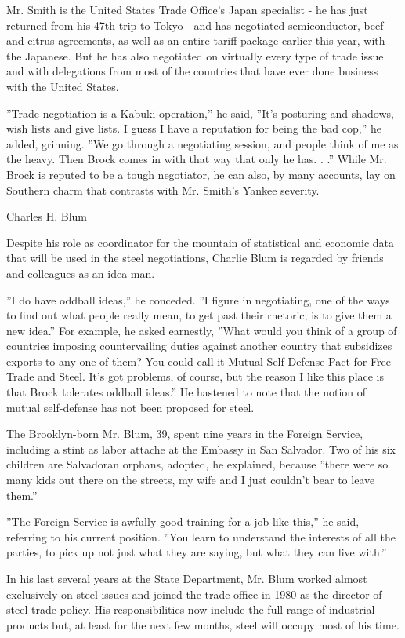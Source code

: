 Mr. Smith is the United States Trade Office's Japan specialist - he has
just returned from his 47th trip to Tokyo - and has negotiated
semiconductor, beef and citrus agreements, as well as an entire tariff
package earlier this year, with the Japanese. But he has also negotiated
on virtually every type of trade issue and with delegations from most of
the countries that have ever done business with the United States.

''Trade negotiation is a Kabuki operation,'' he said, ''It's posturing
and shadows, wish lists and give lists. I guess I have a reputation for
being the bad cop,'' he added, grinning. ''We go through a negotiating
session, and people think of me as the heavy. Then Brock comes in with
that way that only he has. . .'' While Mr. Brock is reputed to be a
tough negotiator, he can also, by many accounts, lay on Southern charm
that contrasts with Mr. Smith's Yankee severity.

Charles H. Blum

Despite his role as coordinator for the mountain of statistical and
economic data that will be used in the steel negotiations, Charlie Blum
is regarded by friends and colleagues as an idea man.

''I do have oddball ideas,'' he conceded. ''I figure in negotiating, one
of the ways to find out what people really mean, to get past their
rhetoric, is to give them a new idea.'' For example, he asked earnestly,
''What would you think of a group of countries imposing countervailing
duties against another country that subsidizes exports to any one of
them? You could call it Mutual Self Defense Pact for Free Trade and
Steel. It's got problems, of course, but the reason I like this place is
that Brock tolerates oddball ideas.'' He hastened to note that the
notion of mutual self-defense has not been proposed for steel.

The Brooklyn-born Mr. Blum, 39, spent nine years in the Foreign Service,
including a stint as labor attache at the Embassy in San Salvador. Two
of his six children are Salvadoran orphans, adopted, he explained,
because ''there were so many kids out there on the streets, my wife and
I just couldn't bear to leave them.''

''The Foreign Service is awfully good training for a job like this,'' he
said, referring to his current position. ''You learn to understand the
interests of all the parties, to pick up not just what they are saying,
but what they can live with.''

In his last several years at the State Department, Mr. Blum worked
almost exclusively on steel issues and joined the trade office in 1980
as the director of steel trade policy. His responsibilities now include
the full range of industrial products but, at least for the next few
months, steel will occupy most of his time.

